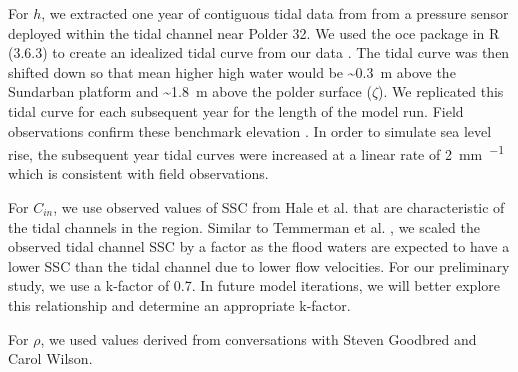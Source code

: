 For $h$, we extracted one year of contiguous tidal data from from a pressure sensor deployed within the tidal channel near Polder 32. We used the oce package in R (3.6.3) to create an idealized tidal curve from our data \citet{kelleyOceAnalysisOceanographic2020}. The tidal curve was then shifted down so that mean higher high water would be \SI{~0.3}{\meter} above the Sundarban platform and \SI{~1.8}{\meter} above the polder surface ($\zeta$). We replicated this tidal curve for each subsequent year for the length of the model run. Field observations confirm these benchmark elevation \citet{auerbachFloodRiskNatural2015,haleSeasonalVariabilityForces2019,bomerSurfaceElevationSedimentation2020}. In order to simulate sea level rise, the subsequent year tidal curves were increased at a linear rate of \SI{2}{\milli\meter\per\year} which is consistent with field observations.


For $C_{in}$, we use observed values of SSC from Hale et al. \citet{haleObservationsScalingTidal2019} that are characteristic of the tidal channels in the region. Similar to Temmerman et al. \citet{temmermanModellingLongtermTidal2003,temmermanModellingEstuarineVariations2004}, we scaled the observed tidal channel SSC by a factor as the flood waters are expected to have a lower SSC than the tidal channel due to lower flow velocities. For our preliminary study, we use a k-factor of 0.7. In future model iterations, we will better explore this relationship and determine an appropriate k-factor.

For $\rho$, we used values derived from conversations with Steven Goodbred and Carol Wilson.